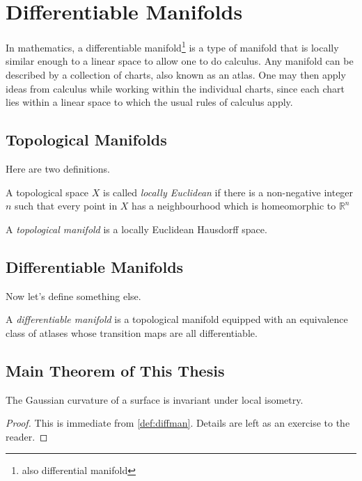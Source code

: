 \chapter{Differentiable Manifolds}
\label{ch:intro}

In mathematics, a differentiable manifold\footnote{also differential manifold} is a type of manifold that is locally similar enough to a linear space to allow one to do calculus. Any manifold can be described by a collection of charts, also known as an atlas. One may then apply ideas from calculus while working within the individual charts, since each chart lies within a linear space to which the usual rules of calculus apply.

\section{Topological Manifolds}

Here are two definitions.

\begin{definition}\label{def:locallyeuclidean}
A topological space $X$ is called \emph{locally Euclidean} if there is a non-negative integer $n$ such that every point in $X$ has a neighbourhood which is homeomorphic to $\mathbb{R}^n$
\end{definition}

\begin{definition}\label{def:topman}
	A \emph{topological manifold} is a locally Euclidean Hausdorff space.
\end{definition}

\section{Differentiable Manifolds}

Now let's define something else.

\begin{definition}\label{def:diffman}
	A \emph{differentiable manifold} is a topological manifold equipped with an equivalence class of atlases whose transition maps are all differentiable.
\end{definition}

\section{Main Theorem of This Thesis}

\begin{theorem}
	The Gaussian curvature of a surface is invariant under local isometry.
\end{theorem}

\begin{proof}
	This is immediate from \autoref{def:diffman}. Details are left as an exercise to the reader.
\end{proof}